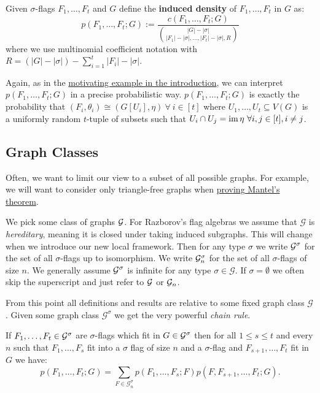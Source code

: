 \begin{definition}
    \label{def:induced_density}
    Given $\sigma$-flags $F_1, \dots, F_t$ and $G$ define the \textbf{induced density} of
    $F_1, \dots, F_t$ in $G$ as:
    \[
    p(F_1, \dots, F_t; G)
    := \frac{c(F_1, \dots, F_t; G)}{
    \binom{|G|-|\sigma|}{|F_1|-|\sigma|, \dots,|F_t|-|\sigma|, R}}
    \]
    where we use multinomial coefficient notation with
    $R=(|G|-|\sigma|)-\sum_{i=1}^t |F_i|-|\sigma|$.
\end{definition}

\begin{note}
    Again, as in the \hyperref[sec:motivating_example]{motivating example in the introduction},
    we can interpret\\ $p(F_1, \dots, F_t; G)$ in a precise probabilistic way.
    $p(F_1, \dots, F_t; G)$ is exactly the probability that
    $(F_i, \theta_i) \cong (G[U_i], \eta)\ \forall\ i\in[t]$ where
    $U_1, \dots, U_t \subseteq V(G)$ is a uniformly random $t$-tuple of subsets such that
    $U_i \cap U_j = \im \eta\ \forall i, j \in [t], i \neq j$.
\end{note}

\subsection{Graph Classes}

Often, we want to limit our view to a subset of all possible graphs. For example, we
will want to consider only triangle-free graphs when
\hyperref[example:first_mantels_proof]{proving Mantel's theorem}.

We pick some class of graphs $\mathcal{G}$. For Razborov's flag algebras we assume that
$\mathcal{G}$ is \textit{hereditary}, meaning it is closed under taking induced subgraphs. This will change
when we introduce our new local framework.
Then for any type $\sigma$ we write $\mathcal{G}^\sigma$ for the set of all $\sigma$-flags up to
isomorphism. We write $\mathcal{G}^\sigma_n$ for the set of all $\sigma$-flags of size $n$.
We generally assume $\mathcal{G}^\sigma$ is infinite for any type $\sigma\in\mathcal{G}$.
If $\sigma=\emptyset$ we often skip the superscript and just refer to
$\mathcal{G}$ or $\mathcal{G}_n$.

From this point all definitions and results are relative to some fixed graph class
$\mathcal{G}$. Given some graph class $\mathcal{G}^\sigma$ we get the very powerful
\textit{chain rule}.

\begin{lemma}
    \label{lemma:chain_rule}
    If $F_1, \dots, F_t \in \mathcal{G}^\sigma$ are $\sigma$-flags which fit in $G\in\mathcal{G}^\sigma$
    then for all $1 \leq s \leq t$ and every $n$ such that
    $F_1, \dots, F_s$ fit into a $\sigma$ flag of size $n$ and a
    $\sigma$-flag and $F_{s+1}, \dots, F_t$ fit in $G$ we have:
    \[
    p(F_1, \dots, F_t; G) = \sum_{F \in \mathcal{G}^\sigma_n}
    p(F_1, \dots, F_s; F)p(F, F_{s+1}, \dots, F_t; G).
    \]
\end{lemma}

